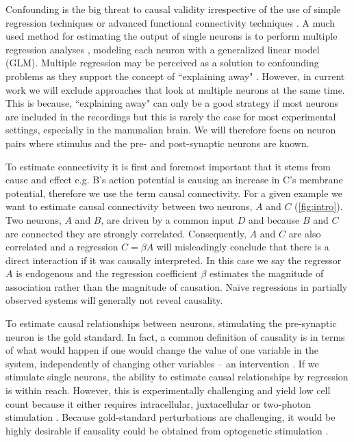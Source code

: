 \documentclass[11pt]{article}
\begin{document}
Confounding is the big threat to causal validity \citep{UpcomingMehlerPaper} irrespective of the use of simple regression techniques or advanced functional connectivity techniques \citep{stevenson2008inferring, honey2009predicting, aitchison2017or, pfau2013robust}.  A much used method for estimating the output of single neurons is to perform multiple regression analyses \citep{pillow2008spatio}, modeling each neuron with a generalized linear model (GLM).  Multiple regression may be perceived as a solution to confounding problems as they support the concept of ``explaining away" \citep{stevenson2008inferring}. However, in current work we will exclude approaches that look at multiple neurons at the same time. This is because, ``explaining away" can only be a good strategy if most neurons are included in the recordings but this is rarely the case for most experimental settings, especially in the mammalian brain. We will therefore focus on neuron pairs where stimulus and the pre- and post-synaptic neurons are known.

To estimate connectivity it is first and foremost important that it stems from cause and effect e.g. B's action potential is causing an increase in C's membrane potential, therefore we use the term causal connectivity.  For a given example we want to estimate causal connectivity between two neurons, $ A $ and $ C $ (\cref{fig:intro}). Two neurons, $ A $ and $ B $, are driven by a common input $ D $ and because $ B $ and $ C $ are connected they are strongly correlated. Consequently, $ A $ and $ C $ are also correlated and a regression  $ C = \beta A $ will misleadingly conclude that there is a direct interaction if it was causally interpreted.  In this case we say the regressor $ A $ is endogenous and the regression coefficient $ \beta $ estimates the magnitude of association rather than the magnitude of causation. Na\"ive regressions in partially observed systems will generally not reveal causality.

To estimate causal relationships between neurons, stimulating the pre-synaptic neuron is the gold standard. In fact, a common definition of causality is in terms of what would happen if one would change the value of one variable in the system, independently of changing other variables -- an intervention \citep{pearl2009causality}. If we stimulate single neurons, the ability to estimate causal relationships by regression is within reach. However, this is experimentally challenging and yield low cell count because it either requires intracellular, juxtacellular or two-photon stimulation \citep{pinault1996novel, lerman2017two, nikolenko2007two, emiliani2015all}. Because gold-standard perturbations are challenging, it would be highly desirable if causality could be obtained from optogenetic stimulation  \citep{boyden2005millisecond, zemelman2002selective}.
\end{document}
